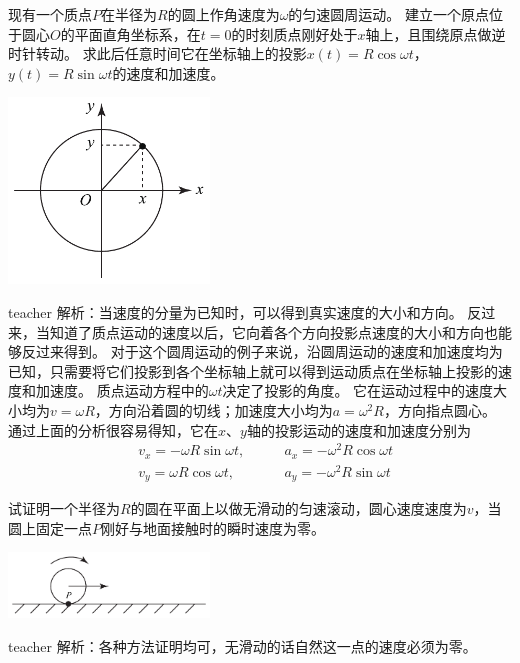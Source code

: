 \begin{example}
现有一个质点$P$在半径为$R$的圆上作角速度为$\omega$的匀速圆周运动。
建立一个原点位于圆心$O$的平面直角坐标系，在$t=0$的时刻质点刚好处于$x$轴上，且围绕原点做逆时针转动。
求此后任意时间它在坐标轴上的投影$x(t) = R\cos\omega t$，$y(t) = R\sin\omega t$的速度和加速度。
\begin{flushright}
\includegraphics[width = 0.4\textwidth]{images/motion-35.pdf} 
\end{flushright}
\begin{taggedblock}{teacher}
\noindent
解析：当速度的分量为已知时，可以得到真实速度的大小和方向。
反过来，当知道了质点运动的速度以后，它向着各个方向投影点速度的大小和方向也能够反过来得到。
对于这个圆周运动的例子来说，沿圆周运动的速度和加速度均为已知，只需要将它们投影到各个坐标轴上就可以得到运动质点在坐标轴上投影的速度和加速度。
质点运动方程中的$\omega t$决定了投影的角度。
它在运动过程中的速度大小均为$v=\omega R$，方向沿着圆的切线；加速度大小均为$a = \omega^2R$，方向指点圆心。
通过上面的分析很容易得知，它在$x$、$y$轴的投影运动的速度和加速度分别为
\begin{eqnarray*}
&v_x = -\omega R \sin \omega t,\qquad & a_x = -\omega^2 R\cos\omega t\\
&v_y = \omega R \cos \omega t,\qquad & a_y = -\omega^2R\sin\omega t
\end{eqnarray*}

\end{taggedblock}
\end{example}





\begin{example}
试证明一个半径为$R$的圆在平面上以做无滑动的匀速滚动，圆心速度速度为$v$，当圆上固定一点$P$刚好与地面接触时的瞬时速度为零。
\begin{flushright}
\includegraphics[width = 0.4\textwidth]{images/motion-36.pdf} 
\end{flushright}
\begin{taggedblock}{teacher}
\noindent
解析：各种方法证明均可，无滑动的话自然这一点的速度必须为零。
\end{taggedblock}
\end{example}


